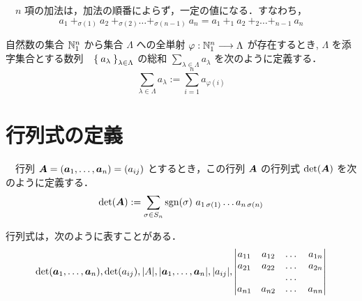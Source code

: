 \documentclass[leqno,autodetect-engine, dvipdfmx-if-dvi,ja=standard]{bxjsarticle}
\begin{document}
		\begin{thm}[一般の結合法則]　$n$ 項の加法は，加法の順番によらず，一定の値になる．すなわち，
			\begin{equation}
				a_1 \ +_{\sigma(1)} \ a_2 \ +_{\sigma(2)}  \dots +_{\sigma(n-1)} \ a_n = a_1 \ +_1 \ a_2 \ +_2 \dots +_{n-1} \ a_n 
			\end{equation}
		\end{thm}
	
		\begin{thm}[一般の交換法則]
		\end{thm}
	
		\begin{dfn} 自然数の集合 $\mathbb{N}_1^n$ から集合 $\Lambda$ への全単射 $\varphi :  \mathbb{N}_1^n \longrightarrow \Lambda$ が存在するとき, $\Lambda$ を添字集合とする数列　$\Set{a_\lambda}_{\lambda \in \Lambda} $ の総和 $\sum_{\lambda \in \Lambda} a_{\lambda}$ を次のように定義する．
			\begin{equation}
				\sum_{\lambda \in \Lambda} a_{\lambda} := \sum_{i=1}^n a_{\varphi(i)}
			\end{equation}
		\end{dfn}
	
	\section{行列式の定義}
	
		\begin{dfn}　行列 $\boldsymbol{A} = (\boldsymbol{a}_1, \dots,\boldsymbol{a}_n) = (a_{i j})$ とするとき，この行列 $\boldsymbol{A}$ の行列式 $\det(\boldsymbol{A})$ を次のように定義する．
			\begin{equation}
				\det(\boldsymbol{A}) := \sum_{\sigma \in S_n} \operatorname{\mathrm{sgn}}(\sigma) \ a_{1 \, \sigma(1)} \dots a_{n \, \sigma(n)}
			\end{equation}
		
			行列式は，次のように表すことがある．
			\begin{equation}
				\det(\boldsymbol{a}_1,\dots,\boldsymbol{a}_n), \det(a_{i j}), \rvert A \lvert,  \rvert \boldsymbol{a}_1, \dots, \boldsymbol{a}_n \lvert, \rvert a_{i j} \lvert,
				\begin{vmatrix}
					a_{1 1} & a_{1 2} & \dots & a_{1 n} \\
					a_{2 1} & a_{2 2} & \dots & a_{2 n } \\
					           &             & \dots &              \\
					a_{n 1} & a_{n 2} & \dots & a_{n n}					           
				\end{vmatrix}
			\end{equation}
		\end{dfn}
	
\end{document}
